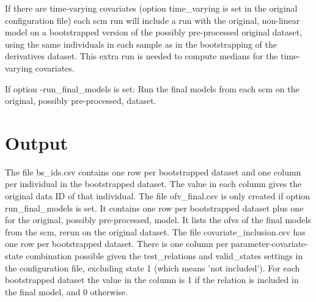 If there are time-varying covariates (option time\_varying is set in the original configuration file) each scm run will include a run with the 
original, non-linear model on a bootstrapped version of the possibly pre-processed original dataset, 
using the same individuals in each sample as in the bootstrapping of the derivatives dataset. 
This extra run is needed to compute medians for the time-varying covariates. 

If option -run\_final\_models is set: Run the final models from each scm on the original, possibly pre-processed, dataset.

\section{Output}

The file bs\_ids.csv contains one row per bootstrapped dataset and one column per individual in the bootstrapped dataset. 
The value in each column gives the original data ID of that individual.
The file ofv\_final.csv is only created if option run\_final\_models is set. It contains one row per bootstrapped dataset plus one for the original, 
possibly pre-processed, model. It lists the ofvs of the final models from the scm, rerun on the original dataset.
The file covariate\_inclusion.csv has one row per bootstrapped dataset. There is one column per parameter-covariate-state combination possible given 
the test\_relations and valid\_states settings in the configuration file, excluding state 1 (which means 'not included'). 
For each bootstrapped dataset the value in the column is 1 if the relation is included in the final model, and 0 otherwise.



